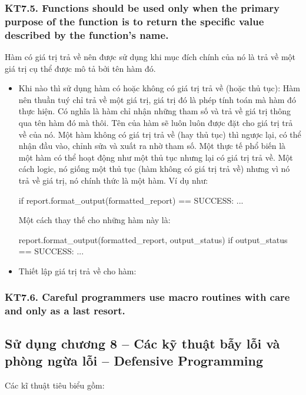 \documentclass[12pt]{report}
\begin{document}
\subsubsection{KT7.5. Functions should be used only when the primary purpose of the function is to return the specific value described by the function's name.}
Hàm có giá trị trả về nên được sử dụng khi mục đích chính của nó là trả về một giá trị cụ thể được mô tả bởi tên hàm đó.
\vspace*{3mm}

\begin{itemize}
	\item Khi nào thì sử dụng hàm có hoặc không có giá trị trả về (hoặc thủ tục):
		Hàm nên thuần tuý chỉ trả về một giá trị, giá trị đó là phép tính toán mà hàm đó thực hiện. Có nghĩa là hàm chỉ nhận những tham số và trả về giá trị thông qua tên hàm đó mà thôi. Tên của hàm sẽ luôn luôn được đặt cho giá trị trả về của nó. Một hàm không có giá trị trả về (hay thủ tục) thì ngược lại, có thể nhận đầu vào, chỉnh sửa và xuất ra nhờ tham số. Một thực tế phổ biến là một hàm có thể hoạt động như một thủ tục nhưng lại có giá trị trả về. Một cách logic, nó giống một thủ tục (hàm không có giá trị trả về) nhưng vì nó trả về giá trị, nó chính thức là một hàm. Ví dụ như:
\begin{python}
if report.format_output(formatted_report) == SUCCESS:
	...
\end{python}
		Một cách thay thế cho những hàm này là:
\begin{python}
report.format_output(formatted_report, output_status)
if output_status == SUCCESS:
	...
\end{python}
	\item Thiết lập giá trị trả về cho hàm: 


\end{itemize} 

\subsubsection{KT7.6. Careful programmers use macro routines with care and only as a last resort.}


\subsection{Sử dụng chương 8 – Các kỹ thuật bẫy lỗi và phòng ngừa lỗi -- Defensive Programming}
\noindent Các kĩ thuật tiêu biểu gồm:
\end{document}
